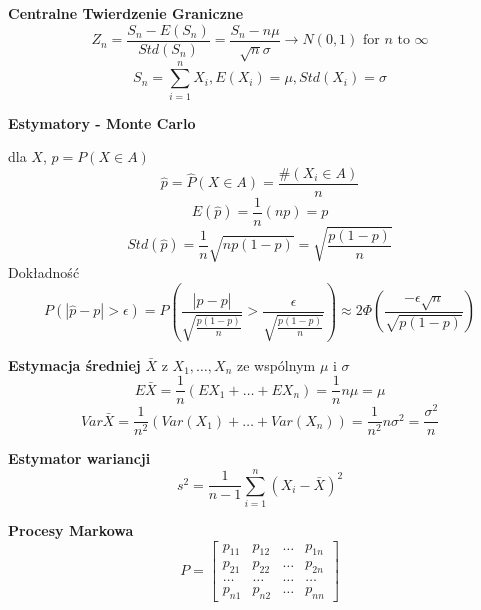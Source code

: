 \documentclass[a4paper]{article}
\begin{document}
    \textbf{Centralne Twierdzenie Graniczne}
    \begin{equation}
        Z_n = \frac{S_n - E(S_n)}{Std(S_n)} = \frac{S_n - n \mu}{\sqrt{n} \sigma} \rightarrow N(0,1) \text{ for } n \text{ to } \infty
    \end{equation}
    \begin{equation*}
        S_n = \sum_{i=1}^n X_i, E(X_i) = \mu, Std(X_i) = \sigma
    \end{equation*}

    \textbf{Estymatory - Monte Carlo}

    dla $X$, $p = P(X \in A)$
    \begin{equation*}
        \hat{p} = \hat{P}(X \in A) = \frac{\#(X_i \in A)}{n}
    \end{equation*}
    \begin{equation*}
        E(\hat{p}) = \frac{1}{n} (np) = p
    \end{equation*}
    \begin{equation*}
        Std(\hat{p}) = \frac{1}{n}\sqrt{np(1-p)} = \sqrt{\frac{p(1-p)}{n}}
    \end{equation*}
    Dokładność
    \begin{equation*}
        P(|\hat{p} - p| > \epsilon) = P \left ( \frac{|\hat{p} - p|}{\sqrt{\frac{p(1-p)}{n}}} > \frac{\epsilon}{\sqrt{\frac{p(1-p)}{n}}} \right )
        \approx 2 \Phi \left ( \frac{-\epsilon \sqrt{n}}{\sqrt{p(1-p)}} \right)
    \end{equation*}

    \textbf{Estymacja średniej} $\bar{X}$ z $X_1, \dots, X_n$ ze wspólnym $\mu$ i $\sigma$
    \begin{equation*}
        E \bar{X} = \frac{1}{n} (EX_1 + \dots + EX_n) = \frac{1}{n} n\mu = \mu
    \end{equation*}
    \begin{equation*}
        Var \bar{X} = \frac{1}{n^2} (Var(X_1) + \dots + Var(X_n)) = \frac{1}{n^2} n\sigma^2 = \frac{\sigma^2}{n}
    \end{equation*}

    \textbf{Estymator wariancji}
    \begin{equation*}
        s^2 = \frac{1}{n-1} \sum_{i=1}^{n} (X_i - \bar{X})^2
    \end{equation*}

    \textbf{Procesy Markowa}
    \begin{equation*}
        P =
        \begin{bmatrix}
            p_{1 1} & p_{1 2} & \dots & p_{1 n}\\
            p_{2 1} & p_{2 2} & \dots & p_{2 n}\\
            \dots & \dots & \dots & \dots\\
            p_{n 1} & p_{n 2} & \dots & p_{n n}
        \end{bmatrix}
    \end{equation*}
\end{document}
